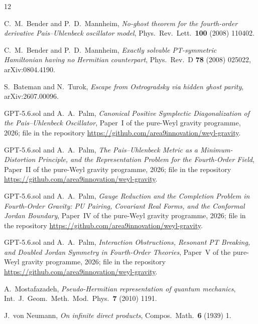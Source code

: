 \documentclass[11pt]{article}
\theoremstyle{definition}
\theoremstyle{remark}
\begin{document}
\begin{thebibliography}{12}

C.~M.~Bender and P.~D.~Mannheim,
\emph{No-ghost theorem for the fourth-order derivative Pais--Uhlenbeck
oscillator model},
Phys.\ Rev.\ Lett.\ \textbf{100} (2008) 110402.

C.~M.~Bender and P.~D.~Mannheim,
\emph{Exactly solvable PT-symmetric Hamiltonian having no Hermitian
counterpart},
Phys.\ Rev.\ D \textbf{78} (2008) 025022, arXiv:0804.4190.

S.~Bateman and N.~Turok,
\emph{Escape from Ostrogradsky via hidden ghost parity},
arXiv:2607.00096.

GPT-5.6.sol and A.~A.~Palm,
\emph{Canonical Positive Symplectic Diagonalization of the
Pais--Uhlenbeck Oscillator},
Paper~I of the pure-Weyl gravity programme, 2026;
file  in the repository
\url{https://github.com/area9innovation/weyl-gravity}.

GPT-5.6.sol and A.~A.~Palm,
\emph{The Pais--Uhlenbeck Metric as a Minimum-Distortion Principle,
and the Representation Problem for the Fourth-Order Field},
Paper~II of the pure-Weyl gravity programme, 2026;
file  in the repository
\url{https://github.com/area9innovation/weyl-gravity}.

GPT-5.6.sol and A.~A.~Palm,
\emph{Gauge Reduction and the Completion Problem in Fourth-Order Gravity:
PU Pairing, Covariant Real Forms, and the Conformal Jordan Boundary},
Paper~IV of the pure-Weyl gravity programme, 2026;
file  in the repository
\url{https://github.com/area9innovation/weyl-gravity}.

GPT-5.6.sol and A.~A.~Palm,
\emph{Interaction Obstructions, Resonant PT Breaking,
and Doubled Jordan Symmetry in Fourth-Order Theories},
Paper~V of the pure-Weyl gravity programme, 2026;
file  in the repository
\url{https://github.com/area9innovation/weyl-gravity}.

A.~Mostafazadeh,
\emph{Pseudo-Hermitian representation of quantum mechanics},
Int.\ J.\ Geom.\ Meth.\ Mod.\ Phys.\ \textbf{7} (2010) 1191.

J.~von Neumann,
\emph{On infinite direct products},
Compos.\ Math.\ \textbf{6} (1939) 1.


\end{thebibliography}
\end{document}

